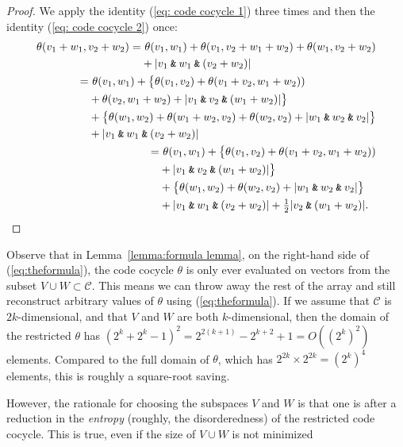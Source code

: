 \documentclass{article}
\theoremstyle{plain}
\theoremstyle{definition}
\def \cC {\mathcal{C}}
\newcommand{\AND}{\mathbin{\textup{\texttt{\&}}}}
\begin{document}
\begin{proof}
We apply the identity (\ref{eq: code cocycle 1}) three times and then the identity (\ref{eq: code cocycle 2}) once:
\begin{align*}
\begin{split}
	\theta(v_1+w_1,v_2+w_2) =&\ \theta(v_1,w_1) + \theta(v_1,v_2+w_1+w_2) + \theta(w_1,v_2+w_2) \\
	&+ |v_1\AND w_1\AND(v_2+w_2)| 
\end{split}\\
\begin{split}
	 =&\ \theta(v_1,w_1) + \big\{ \theta(v_1,v_2) + \theta(v_1+v_2,w_1+w_2)) \\ 
	 & + \theta(v_2,w_1+w_2) + |v_1\AND v_2 \AND (w_1+w_2)| \big\} \\
	 & + \big\{\theta(w_1,w_2) + \theta(w_1+w_2,v_2) + \theta(w_2,v_2) + |w_1\AND w_2\AND v_2| \big\} \\
	 & + |v_1\AND w_1\AND(v_2+w_2)| 
\end{split}\\
\begin{split}
	 =&\ \theta(v_1,w_1) + \big\{ \theta(v_1,v_2) + \theta(v_1+v_2,w_1+w_2)) \\ 
	 & +  |v_1\AND v_2 \AND (w_1+w_2)| \big\} \\
	 & + \big\{\theta(w_1,w_2) + \theta(w_2,v_2) + |w_1\AND w_2\AND v_2| \big\} \\
	 & + |v_1\AND w_1\AND(v_2+w_2)| + \tfrac12|v_2\AND (w_1+w_2)|. \qedhere
\end{split}
\end{align*}
\end{proof}



Observe that in Lemma~\ref{lemma:formula lemma}, on the right-hand side of (\ref{eq:theformula}), the code cocycle $\theta$ is only ever evaluated on vectors from the subset $V \cup W \subset \cC$.
This means we can throw away the rest of the array and still reconstruct arbitrary values of $\theta$ using (\ref{eq:theformula}).
If we assume that $\cC$ is $2k$-dimensional, and that $V$ and $W$ are both $k$-dimensional, then the domain of the restricted $\theta$ has $(2^k+2^k - 1)^2 = 2^{2(k+1)} - 2^{k+2} + 1 = O((2^k)^2)$ elements. 
Compared to the full domain of $\theta$, which has $2^{2k}\times 2^{2k} = (2^k)^4$ elements, this is roughly a square-root saving.

However, the rationale for choosing the subspaces $V$ and $W$ is that one is after a reduction in the \emph{entropy} (roughly, the disorderedness) of the restricted code cocycle. 
This is true, even if the size of $V\cup W$ is not minimized
\end{document}
